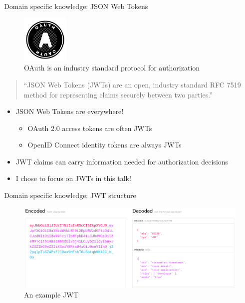 \documentclass[
  9pt,
  ignorenonframetext,
]{beamer}
\providecommand{\tightlist}{%
  \setlength{\itemsep}{0pt}\setlength{\parskip}{0pt}}
\begin{document}
\begin{frame}{Domain specific knowledge: JSON Web Tokens}
\protect\hypertarget{domain-specific-knowledge-json-web-tokens}{}
\begin{figure}
\centering
\includegraphics[width=0.2\textwidth,height=\textheight]{resources/oauth.png}
\caption{OAuth is an industry standard protocol for authorization}
\end{figure}

\begin{quote}
``JSON Web Tokens (JWTs) are an open, industry standard RFC 7519 method
for representing claims securely between two parties.''
\end{quote}

\begin{itemize}
\tightlist
\item
  JSON Web Tokens are everywhere!

  \begin{itemize}
  \tightlist
  \item
    OAuth 2.0 access tokens are often JWTs
  \item
    OpenID Connect identity tokens are always JWTs
  \end{itemize}
\item
  JWT claims can carry information needed for authorization decisions
\item
  I chose to focus on JWTs in this talk!
\end{itemize}






\end{frame}

\begin{frame}{Domain specific knowledge: JWT structure}
\protect\hypertarget{domain-specific-knowledge-jwt-structure}{}
\begin{figure}
\centering
\includegraphics[width=\textwidth,height=1.2\textheight]{resources/jwt-single-picture.png}
\caption{An example JWT}
\end{figure}







\end{frame}
\end{document}
